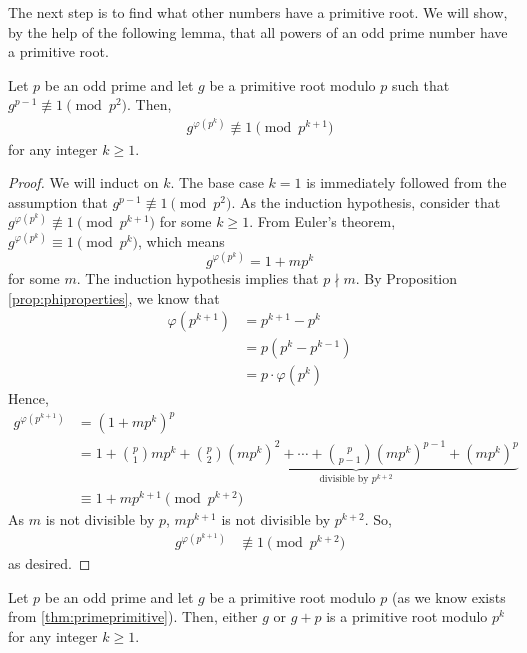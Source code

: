 \documentclass{subfile}
\begin{document}
The next step is to find what other numbers have a primitive root. We will show, by the help of the following lemma, that all powers of an odd prime number have a primitive root.

	\begin{lemma}
		Let $p$ be an odd prime and let $g$ be a primitive root modulo $p$ such that $g^{p-1} \not \equiv 1 \pmod{p^2}$. Then,
			\begin{align*}
				g^{\varphi(p^k)} \not \equiv 1 \pmod{p^{k+1}}
			\end{align*}
		for any integer $k \geq 1$.
	\end{lemma}

	\begin{proof}
		We will induct on $k$. The base case $k=1$ is immediately followed from the assumption that $g^{p-1} \not \equiv 1 \pmod{p^2}$. As the induction hypothesis, consider that $g^{\varphi(p^k)} \not \equiv 1 \pmod{p^{k+1}}$ for some $k\geq 1$. From Euler's theorem, $g^{\varphi(p^k)} \equiv 1 \pmod{p^k}$, which means $$g^{\varphi(p^k)} = 1+mp^k$$ for some $m$. The induction hypothesis implies that $p \nmid m$. By Proposition \ref{prop:phiproperties}, we know that
			\begin{align*}
				\varphi(p^{k+1})
					& =p^{k+1}-p^k\\
					& =p\left(p^k - p^{k-1}\right)\\
					& =p\cdot \varphi(p^k)
			\end{align*}
		Hence,
			\begin{align*}
				g^{\varphi(p^{k+1})}
					& = (1+mp^k)^p \\
					& = 1+ \binom{p}{1}mp^k + \underbrace{\binom{p}{2} (mp^k)^2 + \cdots +\binom{p}{p-1} (mp^k)^{p-1} +(mp^k)^p}_{\mbox{divisible by }p^{k+2}}\\
					& \equiv 1+mp^{k+1} \pmod {p^{k+2}}
			\end{align*}
		As $m$ is not divisible by $p$, $mp^{k+1}$ is not divisible by $p^{k+2}$. So,
			\begin{align*}
				g^{\varphi(p^{k+1})}
					& \not \equiv 1 \pmod {p^{k+2}}
			\end{align*}
		as desired.
	\end{proof}

	\begin{theorem}\label{thm:primepowerprimitive}
		Let $p$ be an odd prime and let $g$ be a primitive root modulo $p$ (as we know exists from \autoref{thm:primeprimitive}). Then, either $g$ or $g+p$ is a primitive root modulo $p^k$ for any integer $k\geq 1$.
	\end{theorem}
\end{document}
